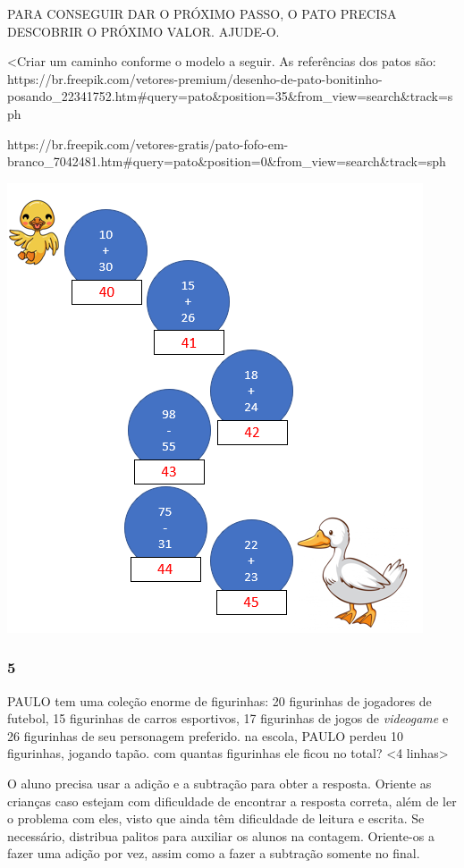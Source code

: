 PARA CONSEGUIR DAR O PRÓXIMO PASSO, O PATO PRECISA DESCOBRIR O PRÓXIMO VALOR. AJUDE-O.

\textless{}Criar um caminho conforme o modelo a seguir. As referências
dos patos são:
https://br.freepik.com/vetores-premium/desenho-de-pato-bonitinho-posando\_22341752.htm\#query=pato\&position=35\&from\_view=search\&track=sph

https://br.freepik.com/vetores-gratis/pato-fofo-em-branco\_7042481.htm\#query=pato\&position=0\&from\_view=search\&track=sph

\includegraphics[width=4.84443in,height=5.24031in]{media/image17.png}

\subsubsection{5}\label{section-12}

PAULO tem uma coleção enorme de figurinhas: 20 figurinhas de
jogadores de futebol, 15 figurinhas de carros esportivos, 17 figurinhas
de jogos de \textit{videogame} e 26 figurinhas de seu personagem
preferido. na escola, PAULO perdeu 10 figurinhas, jogando tapão. com
quantas figurinhas ele ficou no total?
\textless{}4 linhas\textgreater{}

O aluno precisa
usar a adição e a subtração para obter a resposta. Oriente as crianças caso
estejam com dificuldade de encontrar a resposta correta, além de ler o
problema com eles, visto que ainda têm dificuldade de leitura e escrita.
Se necessário, distribua palitos para auxiliar os alunos na contagem.
Oriente-os a fazer uma adição por vez, assim como a fazer a subtração
somente no final.

